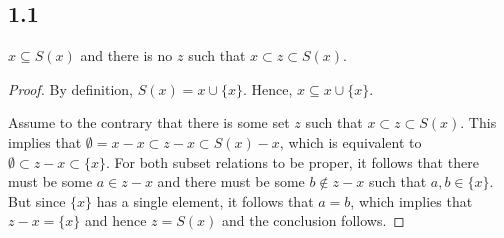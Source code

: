 \subsection*{1.1} $x \subseteq S(x)$ and there is no $z$ such that $x \subset z \subset S(x)$.

\begin{proof}
By definition, $S(x) = x \cup \{x\}$. Hence, $x \subseteq x \cup \{x\}$.

Assume to the contrary that there is some set $z$ such that $x \subset z \subset S(x)$. This implies that $\emptyset = x - x \subset z - x \subset S(x) - x$, which is equivalent to $\emptyset \subset z-x \subset \{x\}$. For both subset relations to be proper, it follows that there must be some $a \in z-x$ and there must be some $b \notin z-x$ such that $a,b \in \{x\}$. But since $\{x\}$ has a single element, it follows that $a=b$, which implies that $z-x = \{x\}$ and hence $z = S(x)$ and the conclusion follows.
\end{proof}

